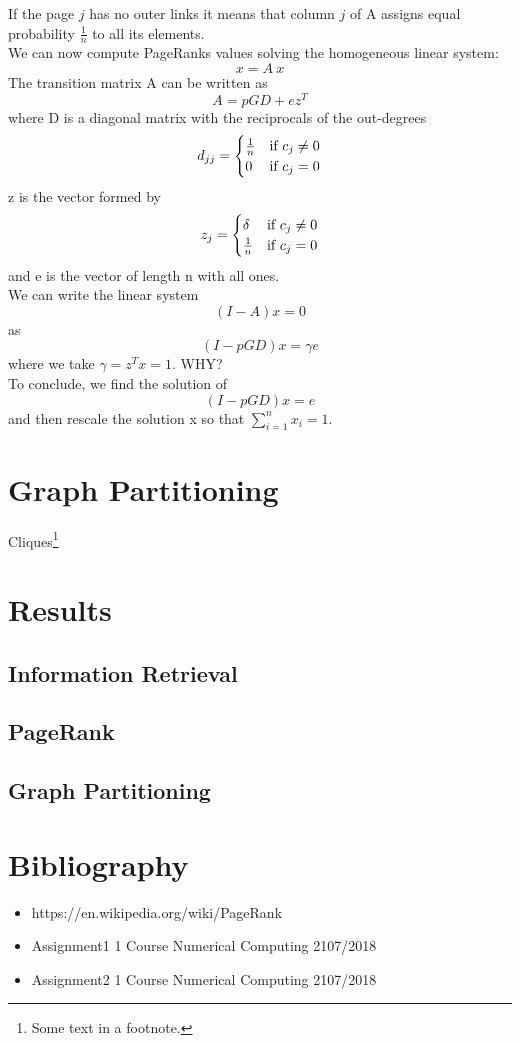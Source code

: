 \documentclass[12 pt]{article}
\begin{document}
If the page $j$ has no outer links it means that column $j$ of A assigns equal probability $\frac{1}{n}$ to all its elements.\\
We can now compute PageRanks values solving the homogeneous linear system:
$$x = A\:x$$
The transition matrix A can be written as
$$A = pGD+ez^{T}$$
where D is a diagonal matrix with the reciprocals of the out-degrees
\begin{equation}\notag
d_{jj} = 
\begin{cases}
\frac{1}{n} & \text{if } c_{j} \neq 0\\
0 & \text{if } c_{j} = 0
\end{cases}
\end{equation}
z is the vector formed by
\begin{equation}\notag
z_{j} = 
\begin{cases}
\delta & \text{if } c_{j} \neq 0\\
\frac{1}{n} & \text{if } c_{j} = 0
\end{cases}
\end{equation}
and e is the vector of length n with all ones.\\
We can write the linear system
$$(I-A)x=0$$
as
$$(I − pGD)x = \gamma e$$
where we take $\gamma = z^{T} x=1$. WHY?\\
To conclude, we find the solution of
$$(I − pGD)x = e$$
and then rescale the solution x so that $\sum\limits_{i=1}^{n} x_i = 1$.
\newpage
\section{Graph Partitioning}
Cliques\footnote{Some text in a footnote.}
\section{Results}
\subsection{Information Retrieval}
\subsection{PageRank}
\subsection{Graph Partitioning}

\section{Bibliography}
\begin{itemize}
\item https://en.wikipedia.org/wiki/PageRank
\item Assignment1 1 Course Numerical Computing 2107/2018
\item Assignment2 1 Course Numerical Computing 2107/2018
\end{itemize}
\end{document}
